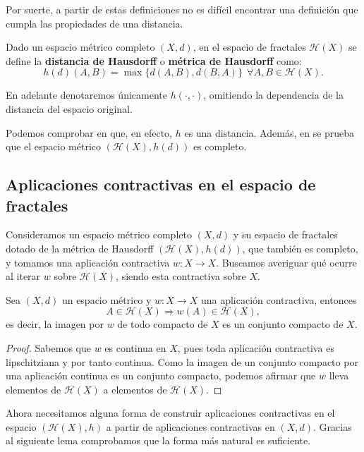Por suerte, a partir de estas definiciones no es difícil encontrar una definición que cumpla las propiedades de una distancia.

\begin{definicion}
    Dado un espacio métrico completo $(X,d)$, en el espacio de fractales $\mathcal{H}(X)$ se define la \textbf{distancia de Hausdorff} o \textbf{métrica de Hausdorff} como:
    $$
    h(d)(A,B)=\max\{d(A,B),d(B,A)\} \ \ \forall A,B\in\mathcal H(X).
    $$
\end{definicion}

En adelante denotaremos únicamente $h(\cdot,\cdot)$, omitiendo la dependencia de la distancia del espacio original.

Podemos comprobar en \cite[Sección 2.6]{Barnsley} que, en efecto, $h$ es una distancia. Además, en \cite[Sección 2.7]{Barnsley} se prueba que el espacio métrico $(\mathcal{H}(X), h(d))$ es completo.

\subsection{Aplicaciones contractivas en el espacio de fractales}

Consideramos un espacio métrico completo $(X,d)$ y su espacio de fractales dotado de la métrica de Hausdorff $(\mathcal H(X), h(d))$, que también es completo, y tomamos una aplicación contractiva $w:X\longrightarrow X$. Buscamos averiguar qué ocurre al iterar $w$ sobre $\mathcal{H}(X)$, siendo esta contractiva sobre $X$. 

\begin{lema}
    \label{lema:contractivas-compactos}
    Sea $(X,d)$ un espacio métrico y $w:X\longrightarrow X$ una aplicación contractiva, entonces 
    $$A\in\mathcal{H}(X)\Rightarrow w(A)\in\mathcal{H}(X),$$
    es decir, la imagen por $w$ de todo compacto de $X$ es un conjunto compacto de $X$.
\end{lema}
\begin{proof}
    Sabemos que $w$ es continua en $X$, pues toda aplicación contractiva es lipschitziana y por tanto continua. Como la imagen de un conjunto compacto por una aplicación continua es un conjunto compacto, podemos afirmar que $w$ lleva elementos de $\mathcal{H}(X)$ a elementos de $\mathcal{H}(X)$.
\end{proof}

Ahora necesitamos alguna forma de construir aplicaciones contractivas en el espacio $(\mathcal{H}(X),h)$ a partir de aplicaciones contractivas en $(X,d)$. Gracias al siguiente lema comprobamos que la forma más natural es suficiente.

